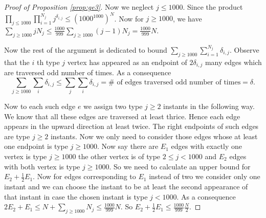 \documentclass[12pt]{article}
\numberwithin{equation}{section}
\numberwithin{equation}{section}
\theoremstyle{definition}
\renewcommand{\1}{\bf 1}
\begin{document}
\begin{proof}[Proof of Proposition \ref{prop:ge3}]
\noindent 
%
%
 
\noindent
Now we neglect $j\le 1000$. Since the product $\prod_{j\le 1000}\prod_{i=1}^{N_{j}}j^{{\delta}_{i,j}}\le \left(1000^{1000}\right)^{N}$. Now for $j\ge 1000$, we have $\sum_{j\ge 1000} j N_{j}\le \frac{1000}{999} \sum_{j\ge 1000} (j-1)N_{j}= \frac{1000}{999} N$. 

Now the rest of the argument is dedicated to bound $\sum_{j\ge 1000}\sum_{i=1}^{N_{j}}{\delta}_{i,j}$. Observe that the $i$ th type $j$ vertex has appeared as an endpoint of $2\delta_{i,j}$ many edges which are traversed odd number of times. As a consequence $$\sum_{j\ge 1000}\sum_{i}\delta_{i,j}\le \sum_{j}\sum_{i} \delta_{i,j}= \# \text{ of edges traversed odd number of times}=\delta.$$ 


Now to each such edge $e$ we assign two type $j\ge 2$ instants in the following way. We know that all these edges are traversed at least thrice. Hence each edge appears in the upward direction at least twice. The right endpoints of such edges are type $j\ge 2$ instants. Now we only need to consider those edges whose at least one endpoint is type $j\ge 1000$. Now say there are $E_{1}$  edges with exactly one vertex is type $j\ge 1000$ the other vertex is of type $2 \le j < 1000 $ and $E_{2}$ edges with both vertex is type $j\ge 1000$. So we need to calculate an upper bound for $E_{2}+\frac{1}{2}{E}_{1}$. Now for edges corresponding to ${E}_{1}$ instead of two we consider only one instant and we can choose the instant to be at least the second appearance of that instant in case the chosen instant is type $j< 1000$. As a consequence $2E_{2}+ E_{1}\le N+ \sum_{j\ge 1000} N_{j}\le \frac{1000}{999}N.$ So $E_{2}+\frac{1}{2}E_{1}\le \frac{1000}{999}\frac{N}{2}$.  






\end{proof}
\end{document}
